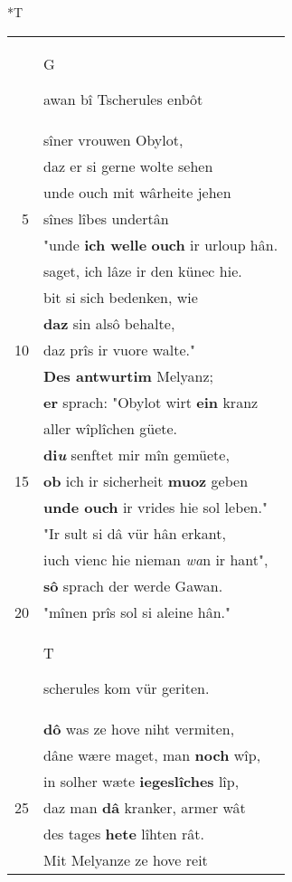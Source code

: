 \documentclass[8pt,a4paper,notitlepage]{article}
\begin{document}
\begin{table}[ht]
\begin{minipage}[t]{0.5\linewidth}
\small
\begin{center}*T
\end{center}
\begin{tabular}{rl}
 & \begin{large}G\end{large}awan bî Tscherules enbôt\\ 
 & sîner vrouwen Obylot,\\ 
 & daz er si gerne wolte sehen\\ 
 & unde ouch mit wârheite jehen\\ 
5 & sînes lîbes undertân\\ 
 & "unde \textbf{ich welle} \textbf{ouch} ir urloup hân.\\ 
 & saget, ich lâze ir den künec hie.\\ 
 & bit si sich bedenken, wie\\ 
 & \textbf{daz} sin alsô behalte,\\ 
10 & daz prîs ir vuore walte."\\ 
 & \textbf{Des antwurtim} Melyanz;\\ 
 & \textbf{er} sprach: "Obylot wirt \textbf{ein} kranz\\ 
 & aller wîplîchen güete.\\ 
 & \textbf{di\textit{u}} senftet mir mîn gemüete,\\ 
15 & \textbf{ob} ich ir sicherheit \textbf{muoz} geben\\ 
 & \textbf{unde ouch} ir vrides hie sol leben."\\ 
 & "Ir sult si dâ vür hân erkant,\\ 
 & iuch vienc hie nieman \textit{wa}n ir hant",\\ 
 & \textbf{sô} sprach der werde Gawan.\\ 
20 & "mînen prîs sol si aleine hân."\\ 
 & \begin{large}T\end{large}scherules kom vür geriten.\\ 
 & \textbf{dô} was ze hove niht vermiten,\\ 
 & dâne wære maget, man \textbf{noch} wîp,\\ 
 & in solher wæte \textbf{iegeslîches} lîp,\\ 
25 & daz man \textbf{dâ} kranker, armer wât\\ 
 & des tages \textbf{hete} lîhten rât.\\ 
 & Mit Melyanze ze hove reit\\ 

\end{tabular}
\end{minipage}
\end{table}
\end{document}
